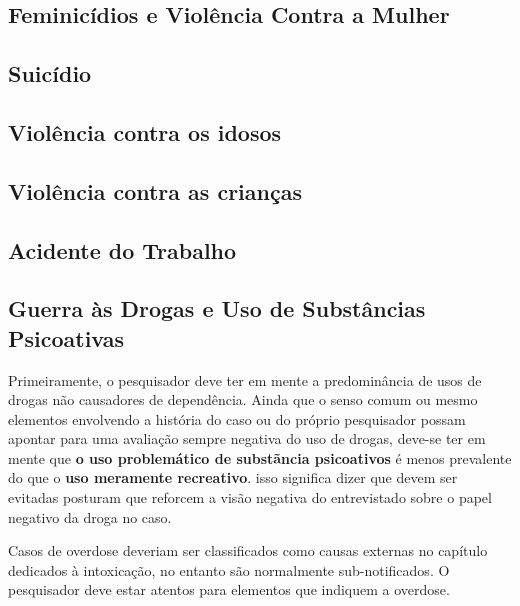 \subsection{Feminicídios e Violência Contra a Mulher}


\subsection{Suicídio}


\subsection{Violência contra os idosos}

\subsection{Violência contra as crianças}

\subsection{Acidente do Trabalho}

\subsection{Guerra às Drogas e Uso de Substâncias Psicoativas}

Primeiramente, o pesquisador deve ter em mente a predominância de usos de drogas não causadores de dependência. Ainda que o senso comum ou mesmo elementos envolvendo a história do caso ou do próprio pesquisador possam apontar para uma avaliação sempre negativa do uso de drogas, deve-se ter em mente que \textbf{o uso problemático de substãncia psicoativos} é menos prevalente do que o \textbf{uso meramente recreativo}. isso significa dizer que devem ser evitadas posturam que reforcem a visão negativa do entrevistado sobre o papel negativo da droga no caso.

Casos de overdose deveriam ser classificados como causas externas no capítulo dedicados à intoxicação, no entanto são normalmente sub-notificados. O pesquisador deve estar atentos para elementos que indiquem a overdose.


